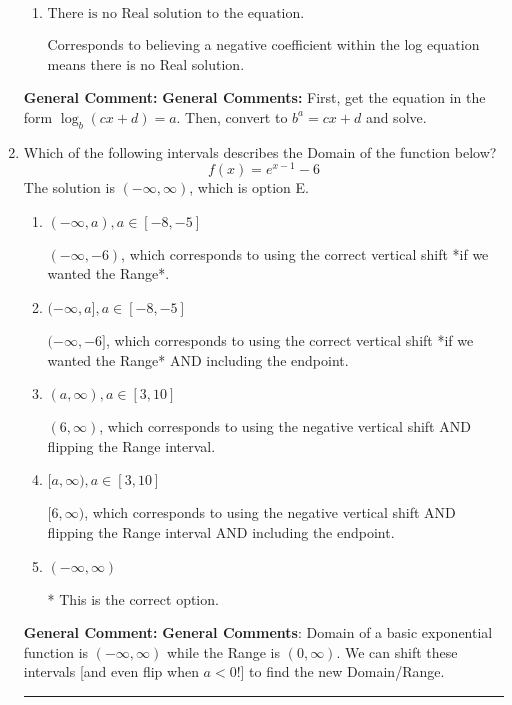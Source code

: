 \documentclass{extbook}[14pt]
\newcommand{\litem}[1]{\item #1

\rule{\textwidth}{0.4pt}}
\begin{document}
\begin{enumerate}
{\begin{enumerate}[label=\Alph*.]
$x = -78.667$, which corresponds to reversing the base and exponent when converting and reversing the value with $x$.
\item \( \text{There is no Real solution to the equation.} \)

Corresponds to believing a negative coefficient within the log equation means there is no Real solution.
\end{enumerate}

\textbf{General Comment:} \textbf{General Comments:} First, get the equation in the form $\log_b{(cx+d)} = a$. Then, convert to $b^a = cx+d$ and solve.
}
\litem{
Which of the following intervals describes the Domain of the function below?
\[ f(x) = e^{x-1}-6 \]The solution is \( (-\infty, \infty) \), which is option E.\begin{enumerate}[label=\Alph*.]
\item \( (-\infty, a), a \in [-8, -5] \)

$(-\infty, -6)$, which corresponds to using the correct vertical shift *if we wanted the Range*.
\item \( (-\infty, a], a \in [-8, -5] \)

$(-\infty, -6]$, which corresponds to using the correct vertical shift *if we wanted the Range* AND including the endpoint.
\item \( (a, \infty), a \in [3, 10] \)

$(6, \infty)$, which corresponds to using the negative vertical shift AND flipping the Range interval.
\item \( [a, \infty), a \in [3, 10] \)

$[6, \infty)$, which corresponds to using the negative vertical shift AND flipping the Range interval AND including the endpoint.
\item \( (-\infty, \infty) \)

* This is the correct option.
\end{enumerate}

\textbf{General Comment:} \textbf{General Comments}: Domain of a basic exponential function is $(-\infty, \infty)$ while the Range is $(0, \infty)$. We can shift these intervals [and even flip when $a<0$!] to find the new Domain/Range.
}
\end{enumerate}
\end{document}
